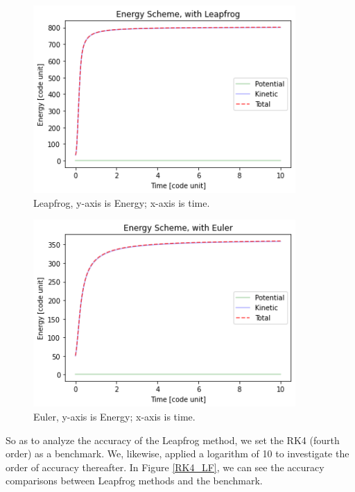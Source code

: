 \documentclass[12pt]{article}
\begin{document}
  \begin{figure}[H]
    \centering 
    \includegraphics[width = 10cm]{LF_E.png}
    \caption{Leapfrog, y-axis is Energy; x-axis is time.}
    \label{E3}
  \end{figure}

  \begin{figure}[H]
    \centering 
    \includegraphics[width = 10cm]{Euler_E.png}
    \caption{Euler, y-axis is Energy; x-axis is time.}
    \label{E4}
  \end{figure}

  So as to analyze the accuracy of the Leapfrog method, we set the RK4 (fourth order) as a benchmark. We, likewise, applied a logarithm of 10 to investigate the order of accuracy thereafter. In Figure \ref{RK4_LF}, we can see the accuracy comparisons between Leapfrog methods and the benchmark.
\end{document}
